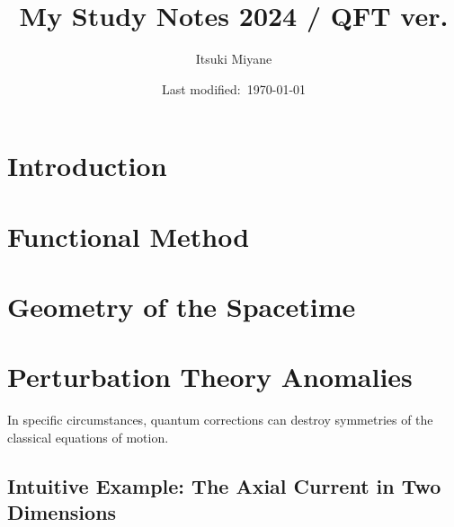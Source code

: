 \documentclass[a4paper,pdftex,11pt]{article}
\title{My Study Notes 2024 / QFT ver.}
\author{Itsuki Miyane}
\date{Last modified:\ \today}
\begin{document}
\maketitle

\tableofcontents

\clearpage
\section{Introduction}
















\clearpage
\section{Functional Method}

















\clearpage
\section{Geometry of the Spacetime}

























\clearpage
\section{Perturbation Theory Anomalies}

In specific circumstances, quantum corrections can destroy symmetries of the classical equations of motion.

\subsection{Intuitive Example: The Axial Current in Two Dimensions}
\end{document}
